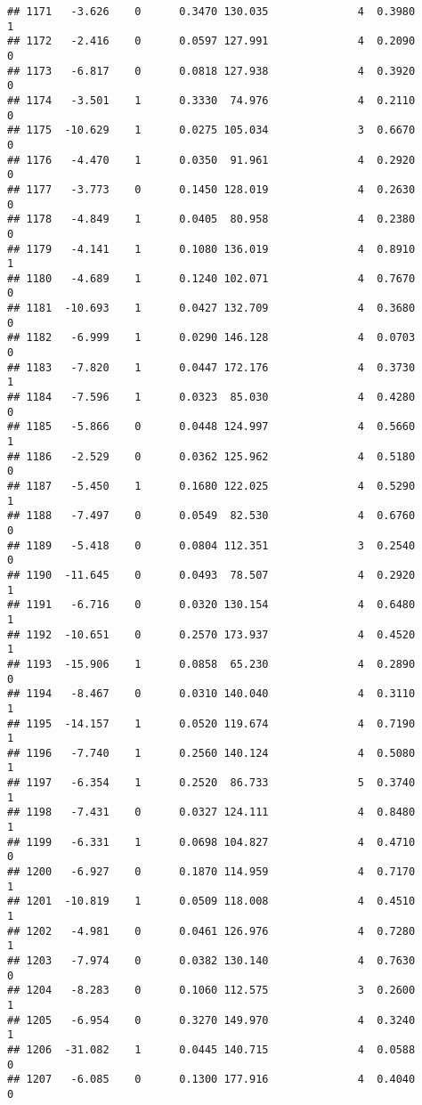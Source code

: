 \documentclass[
]{article}
\begin{document}
\begin{verbatim}
## 1171   -3.626    0      0.3470 130.035              4  0.3980      1
## 1172   -2.416    0      0.0597 127.991              4  0.2090      0
## 1173   -6.817    0      0.0818 127.938              4  0.3920      0
## 1174   -3.501    1      0.3330  74.976              4  0.2110      0
## 1175  -10.629    1      0.0275 105.034              3  0.6670      0
## 1176   -4.470    1      0.0350  91.961              4  0.2920      0
## 1177   -3.773    0      0.1450 128.019              4  0.2630      0
## 1178   -4.849    1      0.0405  80.958              4  0.2380      0
## 1179   -4.141    1      0.1080 136.019              4  0.8910      1
## 1180   -4.689    1      0.1240 102.071              4  0.7670      0
## 1181  -10.693    1      0.0427 132.709              4  0.3680      0
## 1182   -6.999    1      0.0290 146.128              4  0.0703      0
## 1183   -7.820    1      0.0447 172.176              4  0.3730      1
## 1184   -7.596    1      0.0323  85.030              4  0.4280      0
## 1185   -5.866    0      0.0448 124.997              4  0.5660      1
## 1186   -2.529    0      0.0362 125.962              4  0.5180      0
## 1187   -5.450    1      0.1680 122.025              4  0.5290      1
## 1188   -7.497    0      0.0549  82.530              4  0.6760      0
## 1189   -5.418    0      0.0804 112.351              3  0.2540      0
## 1190  -11.645    0      0.0493  78.507              4  0.2920      1
## 1191   -6.716    0      0.0320 130.154              4  0.6480      1
## 1192  -10.651    0      0.2570 173.937              4  0.4520      1
## 1193  -15.906    1      0.0858  65.230              4  0.2890      0
## 1194   -8.467    0      0.0310 140.040              4  0.3110      1
## 1195  -14.157    1      0.0520 119.674              4  0.7190      1
## 1196   -7.740    1      0.2560 140.124              4  0.5080      1
## 1197   -6.354    1      0.2520  86.733              5  0.3740      1
## 1198   -7.431    0      0.0327 124.111              4  0.8480      1
## 1199   -6.331    1      0.0698 104.827              4  0.4710      0
## 1200   -6.927    0      0.1870 114.959              4  0.7170      1
## 1201  -10.819    1      0.0509 118.008              4  0.4510      1
## 1202   -4.981    0      0.0461 126.976              4  0.7280      1
## 1203   -7.974    0      0.0382 130.140              4  0.7630      0
## 1204   -8.283    0      0.1060 112.575              3  0.2600      1
## 1205   -6.954    0      0.3270 149.970              4  0.3240      1
## 1206  -31.082    1      0.0445 140.715              4  0.0588      0
## 1207   -6.085    0      0.1300 177.916              4  0.4040      0

\end{verbatim}
\end{document}

